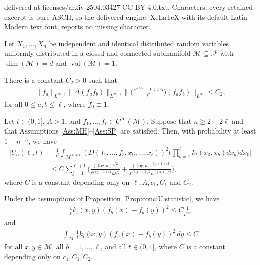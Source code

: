 \documentclass[10pt,a4paper]{amsart}
\begin{document}
delivered at licenses/arxiv-2504.03427-CC-BY-4.0.txt. Characters: every retained excerpt is pure ASCII, so the delivered engine, XeLaTeX with its default Latin Modern text font, reports no missing character.
\begin{assumption}\label{Ass:MH} Let $X_1,\dots,X_n$ be independent and identical distributed random variables uniformly distributed in a closed and connected submanifold $\mathcal{M}\subseteq\mathbb{R}^p$ with $\dim(\mathcal{M})=d$ and $\operatorname{vol}(\mathcal{M})=1$.
\end{assumption}

\begin{assumption}\label{Ass:SP} There is a constant $C_2>0$ such that
    \begin{align*}
        \|f_a\|_{L^\infty},\|\Delta (f_af_b)\|_{L^\infty},\Big\|\Big(\frac{e^{-t\Delta}-I+t\Delta}{t^2}\Big)(f_af_b)\Big\|_{L^\infty}\leq C_2,
    \end{align*}
    for all $0\leq a,b\leq \ell$, where $f_0\equiv 1$.
\end{assumption}

\begin{proposition}\label{Prop:conc:U:statistic}
    Let $t\in(0,1]$, $A>1$, and $f_1,\dots,f_\ell\in C^\infty(\mathcal{M})$. Suppose that $n\geq 2+2\ell$ and that Assumptions \ref{Ass:MH}--\ref{Ass:SP} are satisfied. Then, with probability at least $1-n^{-A}$, we have
    \begin{align*}
        \Big| U_{n}(\ell,t)&-\frac{1}{t^\ell}\int_{\mathcal{M}^{\ell+1}}(D(f_1,\dots,f_\ell,x_0,\dots,x_\ell))^2\Big(\prod_{b=1}^\ell k_t(x_0,x_b)dx_b\Big)dx_0 \Big|\\
        &\leq C\sum_{j=1}^{\ell+1}\Big(\frac{(\log n)^{j/2}}{t^{d(j-1)/4}n^{j/2}}+\frac{(\log n)^{(j+1)/2}}{t^{d(j-1)/2}n^{(j+1)/2}}\Big),
    \end{align*}
    where $C$ is a constant depending only on $\ell, A, c_1,C_1$ and $C_2$.
\end{proposition}

\begin{lemma}\label{lemma:bound:kernel:smoothness}
    Under the assumptions of Proposition \ref{Prop:conc:U:statistic}, we have 
    \begin{align*}
        \frac{1}{t}k_t(x,y)(f_b(x)-f_b(y))^2\leq C\frac{1}{t^{d/2}}
    \end{align*}
    and
    \begin{align*}
        \int_{\mathcal{M}}\frac{1}{t}k_t(x,y)(f_b(x)-f_b(y))^2\,dy\leq C
    \end{align*}
    for all $x,y\in\mathcal{M}$, all $b=1,\dots,\ell$, and all $t\in(0,1]$, where $C$ is a constant depending only on $c_1,C_1,C_2$.
\end{lemma}
\end{document}
